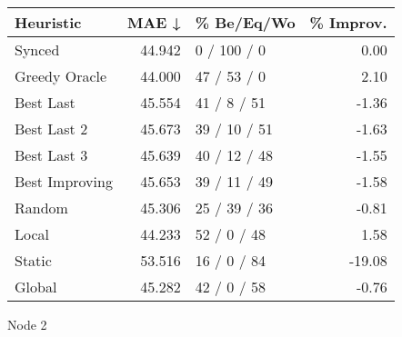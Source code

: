 \begin{tabular}{lrlr}
\toprule
\textbf{Heuristic} & \textbf{MAE ↓} & \textbf{\% Be/Eq/Wo} & \textbf{\% Improv.} \\
\midrule
            Synced &         44.942 &          0 / 100 / 0 &                0.00 \\
     Greedy Oracle &         44.000 &          47 / 53 / 0 &                2.10 \\
         Best Last &         45.554 &          41 / 8 / 51 &               -1.36 \\
       Best Last 2 &         45.673 &         39 / 10 / 51 &               -1.63 \\
       Best Last 3 &         45.639 &         40 / 12 / 48 &               -1.55 \\
    Best Improving &         45.653 &         39 / 11 / 49 &               -1.58 \\
            Random &         45.306 &         25 / 39 / 36 &               -0.81 \\
             Local &         44.233 &          52 / 0 / 48 &                1.58 \\
            Static &         53.516 &          16 / 0 / 84 &              -19.08 \\
            Global &         45.282 &          42 / 0 / 58 &               -0.76 \\
\bottomrule
\end{tabular}
\caption{Node 2}
\label{tab:non_lr05_le2_bs2_2}
